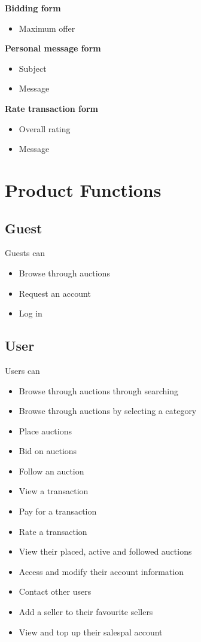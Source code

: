 	\textbf{Bidding form}
		\begin{itemize}
			\item Maximum offer
		\end{itemize}
	\textbf{Personal message form}
		\begin{itemize}
			\item Subject
			\item Message 
		\end{itemize}
	\textbf{Rate transaction form}
		\begin{itemize}
			\item Overall rating
			\item Message 
		\end{itemize}
		
\section{Product Functions}
	\subsection{Guest}
		Guests can
		\begin{itemize}
			\item Browse through auctions
			\item Request an account
			\item Log in
		\end{itemize}
	\subsection{User}
		Users can
		\begin{itemize}
			\item Browse through auctions through searching
			\item Browse through auctions by selecting a category
			\item Place auctions
			\item Bid on auctions
			\item Follow an auction
			\item View a transaction
			\item Pay for a transaction
			\item Rate a transaction
			\item View their placed, active and followed auctions
			\item Access and modify their account information
			\item Contact other users
			\item Add a seller to their favourite sellers
			\item View and top up their salespal account
		\end{itemize}
